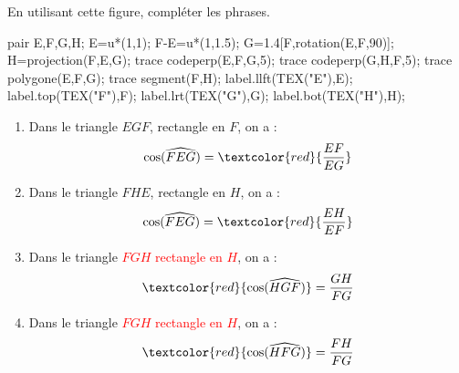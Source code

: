 \begin{corrige}
    En utilisant cette figure, compléter les phrases.

    \begin{Geometrie}
        pair E,F,G,H;
        E=u*(1,1);
        F-E=u*(1,1.5);
        G=1.4[F,rotation(E,F,90)];
        H=projection(F,E,G);
        trace codeperp(E,F,G,5);
        trace codeperp(G,H,F,5);
        trace polygone(E,F,G);
        trace segment(F,H);
        label.llft(TEX("E"),E);
        label.top(TEX("F"),F);
        label.lrt(TEX("G"),G);
        label.bot(TEX("H"),H);
    \end{Geometrie}

    \begin{enumerate}
        \item Dans le triangle $EGF$, rectangle en $F$, on a : $$\text{cos}(\widehat{FEG})=\textcolor{red}{\dfrac{EF}{EG}}$$
        \item Dans le triangle $FHE$, rectangle en $H$, on a : $$\text{cos}(\widehat{FEG})=\textcolor{red}{\dfrac{EH}{EF}}$$
        \item Dans le triangle \textcolor{red}{$FGH$ rectangle en $H$}, on a : $$\textcolor{red}{\text{cos}(\widehat{HGF})}=\dfrac{GH}{FG}$$
        \item Dans le triangle \textcolor{red}{$FGH$ rectangle en $H$}, on a : $$\textcolor{red}{\text{cos}(\widehat{HFG})}=\dfrac{FH}{FG}$$
    \end{enumerate}
\end{corrige}

